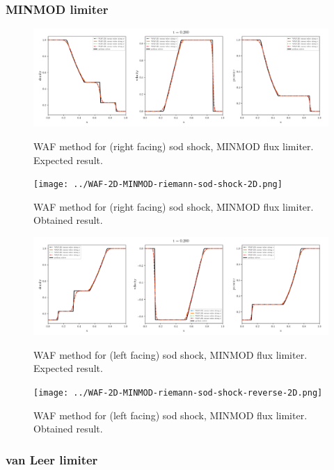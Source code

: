 \clearpage
\subsubsection{MINMOD limiter}

    \begin{figure}[htbp]
        \centering
        \includegraphics[width=.9\textwidth]{./figures/WAF-2D-MINMOD-riemann-sod-shock-2D.png}%
        \caption{WAF method for (right facing) sod shock, MINMOD flux limiter. Expected result.}
        \texttt{[image: ../WAF-2D-MINMOD-riemann-sod-shock-2D.png]}%
        \caption{WAF method for (right facing) sod shock, MINMOD flux limiter. Obtained result.}
    \end{figure}


    \begin{figure}[htbp]
        \centering
        \includegraphics[width=.9\textwidth]{./figures/WAF-2D-MINMOD-riemann-sod-shock-reverse-2D.png}%
        \caption{WAF method for (left facing) sod shock, MINMOD flux limiter. Expected result.}
        \texttt{[image: ../WAF-2D-MINMOD-riemann-sod-shock-reverse-2D.png]}%
        \caption{WAF method for (left facing) sod shock, MINMOD flux limiter. Obtained result.}
    \end{figure}






\clearpage
\subsubsection{van Leer limiter}

